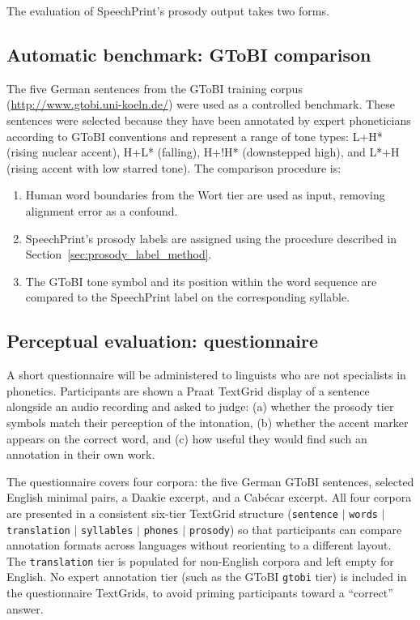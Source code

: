 The evaluation of SpeechPrint's prosody output takes two forms.

\subsection{Automatic benchmark: GToBI comparison}

The five German sentences from the GToBI training corpus
(\url{http://www.gtobi.uni-koeln.de/}) were used as a controlled benchmark.
These sentences were selected because they have been annotated by expert
phoneticians according to GToBI conventions and represent a range of tone types:
L+H* (rising nuclear accent), H+L* (falling), H+!H* (downstepped high), and
L*+H (rising accent with low starred tone). The comparison procedure is:
\begin{enumerate}
\item Human word boundaries from the Wort tier are used as input, removing
      alignment error as a confound.
\item SpeechPrint's prosody labels are assigned using the procedure described
      in Section~\ref{sec:prosody_label_method}.
\item The GToBI tone symbol and its position within the word sequence are
      compared to the SpeechPrint label on the corresponding syllable.
\end{enumerate}

\subsection{Perceptual evaluation: questionnaire}

A short questionnaire will be administered to linguists who are not specialists
in phonetics. Participants are shown a Praat TextGrid display of a sentence
alongside an audio recording and asked to judge: (a) whether the prosody tier
symbols match their perception of the intonation, (b) whether the accent marker
appears on the correct word, and (c) how useful they would find such an
annotation in their own work.

The questionnaire covers four corpora: the five German GToBI sentences,
selected English minimal pairs, a Daakie excerpt, and a Cabécar excerpt.
All four corpora are presented in a consistent six-tier TextGrid structure
(\texttt{sentence} $|$ \texttt{words} $|$ \texttt{translation} $|$
\texttt{syllables} $|$ \texttt{phones} $|$ \texttt{prosody}) so that
participants can compare annotation formats across languages without
reorienting to a different layout. The \texttt{translation} tier is populated
for non-English corpora and left empty for English. No expert annotation tier
(such as the GToBI \texttt{gtobi} tier) is included in the questionnaire
TextGrids, to avoid priming participants toward a ``correct'' answer.

